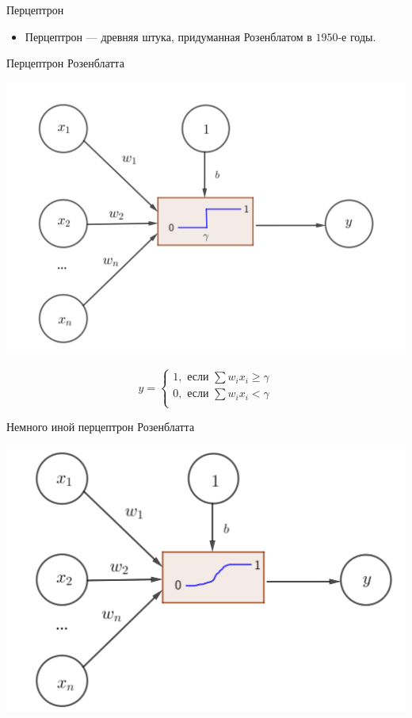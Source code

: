 \documentclass[notes,12pt, aspectratio=169]{beamer}
\begin{document}
\begin{frame}{Перцептрон}
\begin{itemize}
	\item  {\color{blue} Перцептрон —} древняя штука, придуманная Розенблатом в $1950$-е годы.
\end{itemize}
\end{frame}



\begin{frame}{Перцептрон Розенблатта}
\begin{center}
	\includegraphics[width=0.55\paperwidth]{neuron_1.png}
\end{center}
\[
y = \begin{cases}
1, \text{ если } \sum w_i x_i \ge \gamma \\
0, \text{ если } \sum w_i x_i < \gamma \\
\end{cases}
\]
\end{frame}


\begin{frame}{Немного иной перцептрон Розенблатта}
\begin{center}
	\includegraphics[width=0.55\paperwidth]{neuron_2.png}
\end{center}
\end{frame}
\end{document}
